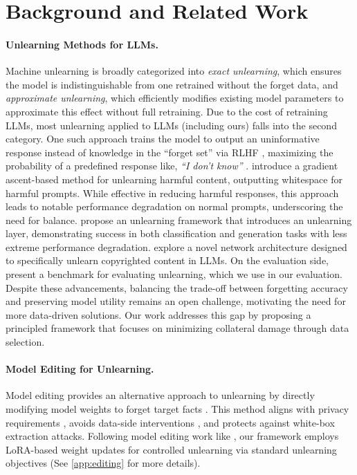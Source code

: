 \section{Background and Related Work}
\paragraph{Unlearning Methods for LLMs.} Machine unlearning is broadly categorized into \emph{exact unlearning}, which ensures the model is indistinguishable from one retrained without the forget data, and \emph{approximate unlearning}, which efficiently modifies existing model parameters to approximate this effect without full retraining. 
Due to the cost of retraining LLMs, most unlearning applied to LLMs (including ours) falls into the second category. 
One such approach trains the model to output an uninformative response instead of knowledge in the ``forget set'' via RLHF \citep{ouyang2022training}, maximizing the probability of a predefined response like, \emph{``I don't know''} \citep{wen2024know}. 
\citet{yao2023large} introduce a gradient ascent-based method for unlearning harmful content, outputting whitespace for harmful prompts. 
While effective in reducing harmful responses, this approach leads to notable performance degradation on normal prompts, underscoring the need for balance. 
\citet{chen2023unlearn} propose an unlearning framework that introduces an unlearning layer, demonstrating success in both classification and generation tasks with less extreme performance degradation. 
\citet{eldan2023s} explore a novel network architecture designed to specifically unlearn copyrighted content in LLMs. 
On the evaluation side, \citet{maini2024tofu} present a benchmark for evaluating unlearning, which we use in our evaluation. 
Despite these advancements, balancing the trade-off between forgetting accuracy and preserving model utility remains an open challenge, motivating the need for more data-driven solutions. 
Our work addresses this gap by proposing a principled framework that focuses on minimizing collateral damage through data selection.

\paragraph{Model Editing for Unlearning.} Model editing provides an alternative approach to unlearning by directly modifying model weights to forget target facts \citep{de-cao-etal-2021-editing, dai2022knowledge, mitchell2022fast, meng2022locating}. This method aligns with privacy requirements \citep{zhang2024right}, avoids data-side interventions \citep{debenedetti2024privacy}, and protects against white-box extraction attacks. Following model editing work like \citet{patil2024unlearning}, our framework employs LoRA-based weight updates for controlled unlearning via standard unlearning objectives (See \cref{app:editing} for more details). 





